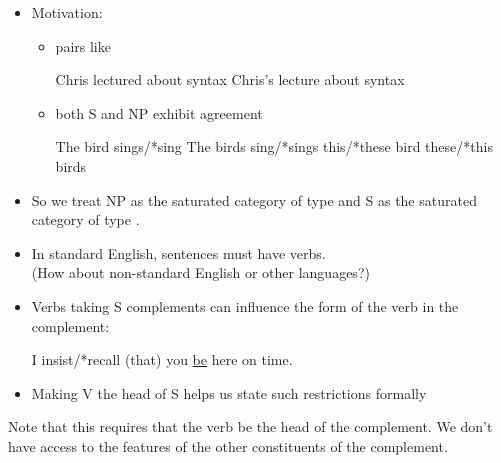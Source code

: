 \documentclass[a4paper,landscape,headrule,footrule]{foils}
\begin{document}
\begin{itemize}
\item Motivation:
\begin{itemize}
  \item pairs like 
    \begin{exe}
      \ix Chris lectured about syntax
      \ix Chris’s lecture about syntax
    \end{exe}
  \item both S and NP exhibit agreement
 \begin{exe}
   \ix The bird sings/*sing
   \ix The birds sing/*sings
   \ix this/*these bird 
   \ix these/*this birds
\end{exe}
\end{itemize}
\item So we treat NP as the saturated category of type 
and S as the saturated category of type .
\end{itemize}

\begin{itemize}
\item In standard English, sentences must have verbs.
\\ (How about non-standard English or other
languages?)
\item Verbs taking S complements can influence the form
of the verb in the complement:
\begin{exe}
  \ix I insist/*recall (that) you \ul{be} here on time.
\end{exe}
\item Making V the head of S helps us state such
restrictions formally
\end{itemize}




Note that this requires that the verb be the head of the
complement. We don’t have access to the features of the other
constituents of the complement.

\begin{center}\small
\end{center}
\end{document}
